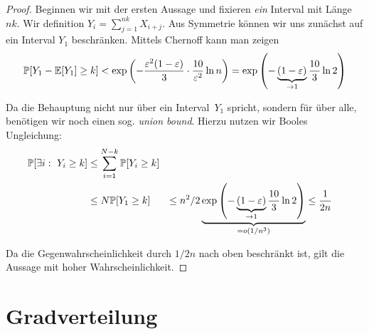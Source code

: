 \begin{proof}
    Beginnen wir mit der ersten Aussage und fixieren \emph{ein} Interval mit Länge $nk$.
    Wir definition $Y_i = \sum_{j=1}^{nk} X_{i+j}$.
    Aus Symmetrie können wir uns zunächst auf ein Interval $Y_1$ beschränken.
    Mittels Chernoff kann man zeigen
    \begin{align}
        \mathbb{P}\!\left[Y_1 - \mathbb{E}\!\left[Y_1\right] \ge k\right] < \exp\left(-\frac{\varepsilon^2(1-\varepsilon)}{3} \cdot \frac{10}{\varepsilon^2} \ln n \right)
        = \exp\left(- \underbrace{(1-\varepsilon)}_{\to 1} \frac{10}{3} \ln 2   \right)
    \end{align}

    Da die Behauptung nicht nur über ein Interval~$Y_1$ spricht, sondern für über alle, benötigen wir noch einen sog. \emph{union bound}.
    Hierzu nutzen wir Booles Ungleichung:
    \begin{align}
        \mathbb{P}\!\left[\exists i:\ Y_i \ge k\right] & \le \sum_{i=1}^{N-k} \mathbb{P}\!\left[Y_i \ge k\right]                                                                         \\
                                     & \le N \mathbb{P}\!\left[Y_1 \ge k\right]
                                     & \le n^2 / 2 \underbrace{\exp\left(- \underbrace{(1-\varepsilon)}_{\to 1} \frac{10}{3} \ln 2 \right)}_{=o(1/n^3)}
                                     & \le \frac{1}{2n}
    \end{align}

    Da die Gegenwahrscheinlichkeit durch $1/2n$ nach oben beschränkt ist, gilt die Aussage mit hoher Wahrscheinlichkeit.
\end{proof}

\section{Gradverteilung}
